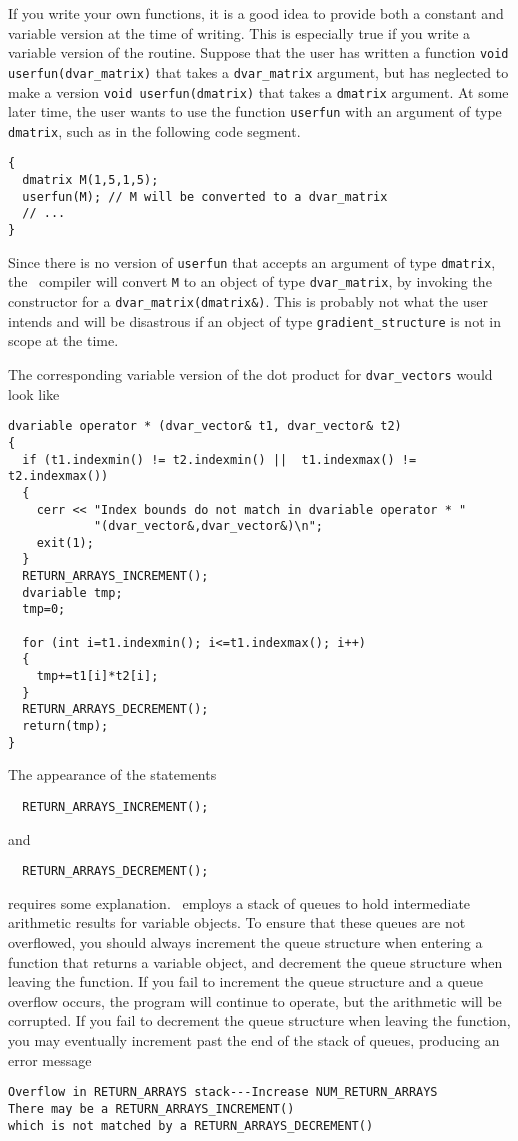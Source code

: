 \documentclass{admbmanual}
\begin{document}
If you write your own functions, it is a good idea to provide
both a constant and variable version at the time of writing.
This is especially true if you write a variable version of the
routine.
Suppose that the user has written a function 
\texttt{void userfun(dvar\_matrix)}
that takes a \texttt{dvar\_matrix} argument, but has neglected to
make a version \texttt{void userfun(dmatrix)} that takes a 
\texttt{dmatrix} argument. At some later time, the user wants to
use the function \texttt{userfun} with an argument of type
\texttt{dmatrix}, such as in the following code segment.
\begin{lstlisting}
{
  dmatrix M(1,5,1,5);
  userfun(M); // M will be converted to a dvar_matrix
  // ...
}
\end{lstlisting}
Since there is no version of \texttt{userfun} that
accepts an argument of type \texttt{dmatrix}, the \cplus\ compiler
will convert \texttt{M} to an object of type \texttt{dvar\_matrix},
by invoking the constructor for a \texttt{dvar\_matrix(dmatrix\&)}.
This is probably not what the user intends and will be disastrous
if an object of type \texttt{gradient\_structure} is not in scope at the time. 

The corresponding variable version of the dot product
for \texttt{dvar\_vectors}
would look like
\begin{lstlisting}
dvariable operator * (dvar_vector& t1, dvar_vector& t2)
{
  if (t1.indexmin() != t2.indexmin() ||  t1.indexmax() != t2.indexmax())  
  {
    cerr << "Index bounds do not match in dvariable operator * "
            "(dvar_vector&,dvar_vector&)\n";
    exit(1);
  }
  RETURN_ARRAYS_INCREMENT();
  dvariable tmp;
  tmp=0;
     
  for (int i=t1.indexmin(); i<=t1.indexmax(); i++)
  {
    tmp+=t1[i]*t2[i];
  }
  RETURN_ARRAYS_DECREMENT();
  return(tmp);
}
\end{lstlisting}

The appearance of the statements
\begin{lstlisting}
  RETURN_ARRAYS_INCREMENT();
\end{lstlisting}
and 
\begin{lstlisting}
  RETURN_ARRAYS_DECREMENT();
\end{lstlisting}
requires some explanation.
\scAD\ employs a stack of queues to hold intermediate arithmetic
results for variable objects. To ensure that these queues are
not overflowed, you should always increment the queue structure when
entering a function that returns a variable object, and decrement
the queue structure when leaving the function.  If you fail to increment
the queue structure and a queue overflow occurs, the program will
continue to operate, but the arithmetic will be corrupted.
If you fail to decrement the queue structure when leaving the function,
you may eventually
increment past the end of the stack of queues, producing an error message
\begin{lstlisting}
Overflow in RETURN_ARRAYS stack---Increase NUM_RETURN_ARRAYS
There may be a RETURN_ARRAYS_INCREMENT()
which is not matched by a RETURN_ARRAYS_DECREMENT()
\end{lstlisting}
\end{document}
